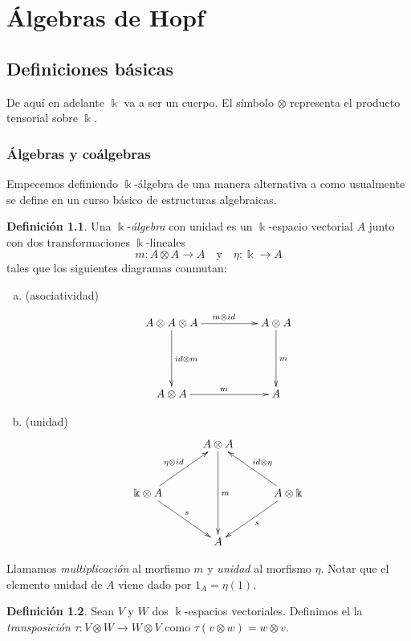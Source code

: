 \documentclass[a4paper,oneside,fleqn,11pt]{report}
\date{23/03/2015}
\newcommand\ox{\otimes}
\newcommand\field{\Bbbk}
\theoremstyle{definition}
\newtheorem{definition}{Definición}[section]
\theoremstyle{definition}
\numberwithin{prop}{subsection}
\begin{document}
\chapter{Álgebras de Hopf}

\section{Definiciones básicas}
De aquí en adelante $\field$ va a ser un cuerpo. El símbolo $\ox$ representa el producto tensorial
sobre $\field$.

\subsection{Álgebras y coálgebras}
Empecemos definiendo $\field$-álgebra de una manera alternativa a como usualmente se define en un
curso básico de estructuras algebraicas.

\begin{definition}\label{defalgebra} Una $\field$-\emph{álgebra} con unidad es un $\field$-espacio vectorial $A$ junto con dos
transformaciones $\field$-lineales
\[
	m: A \ox A \to A \quad\text{y}\quad \eta: \field \to A
\]
tales que los siguientes diagramas conmutan:
\begin{enumerate}[(a)]
\item (asociatividad)
\begin{align*}
\xymatrix@=5em{
	A \ox A \ox A \ar[r]^{m \ox id} \ar[d]^{id \ox m} & A \ox A \ar[d]^{m} \\
	A \ox A \ar[r]^{m} & A
}
\end{align*}
\item (unidad)
\begin{align*}
\xymatrix@=3em{
	& A \ox A \ar[dd]^{m} & \\
	\field \ox A \ar[ur]^{\eta \ox id} \ar[dr]^{s} & & A \ox \field \ar[ul]_{id \ox \eta} \ar[dl]^{s} \\
	& A &
}
\end{align*}
\end{enumerate}
Llamamos \emph{multiplicación} al morfismo $m$ y \emph{unidad} al morfismo $\eta$. 
Notar que el elemento unidad de $A$ viene dado por $1_{A} = \eta(1)$.
\end{definition}

\begin{definition} Sean $V$ y $W$ dos $\field$-espacios vectoriales.
Definimos el la \emph{transposición} $\tau: V \ox W \to W \ox V$ como $\tau(v \ox w) = w \ox v$.
\end{definition}
\end{document}

